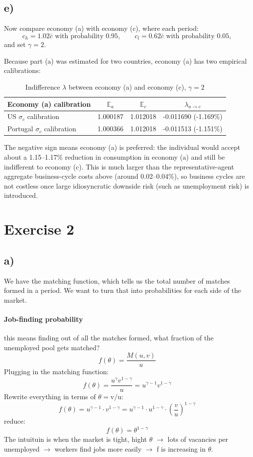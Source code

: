 \documentclass[12pt]{article}
\begin{document}
\subsection{e)}

Now compare economy (a) with economy (c), where each period:
$$
c_h=1.02\bar c \text{ with probability }0.95, \qquad
c_l=0.62\bar c \text{ with probability }0.05,
$$
and set $\gamma=2$.

Because part (a) was estimated for two countries, economy (a) has two empirical calibrations:
\begin{table}[H]
\centering
\caption{Indifference $\lambda$ between economy (a) and economy (c), $\gamma=2$}
\label{tab:ex1e}
\begin{tabular}{lccc}
\toprule
Economy (a) calibration & $\mathbb{E}_a$ & $\mathbb{E}_c$ & $\lambda_{a\to c}$ \\
\midrule
US $\sigma_c$ calibration & 1.000187 & 1.012018 & -0.011690 \;(-1.169\%) \\
Portugal $\sigma_c$ calibration & 1.000366 & 1.012018 & -0.011513 \;(-1.151\%) \\
\bottomrule
\end{tabular}
\end{table}

The negative sign means economy (a) is preferred: the individual would accept about a 1.15--1.17\% reduction in consumption in economy (a) and still be indifferent to economy (c). This is much larger than the representative-agent aggregate business-cycle costs above (around 0.02--0.04\%), so business cycles are not costless once large idiosyncratic downside risk (such as unemployment risk) is introduced.


\section{Exercise 2}
\subsection{a)}
We have the matching function, which tells us the total number of matches formed in a period. We want to turn that into probabilities for each side of the market.
\paragraph{Job-finding probability}
this means finding out of all the matches formed, what fraction of the unemployed pool gets matched?
$$
f(\theta)=\frac{M(u, v)}{u}
$$
Plugging in the matching function:
$$
f(\theta)=\frac{u^\gamma v^{1-\gamma}}{u}=u^{\gamma-1} v^{1-\gamma}
$$
Rewrite everything in terms of $\theta=\mathrm{v} / \mathrm{u}$:
$$
f(\theta)=u^{\gamma-1} \cdot v^{1-\gamma}=u^{\gamma-1} \cdot u^{1-\gamma} \cdot\left(\frac{v}{u}\right)^{1-\gamma}
$$
reduce:
$$
\boxed{f(\theta)=\theta^{1-\gamma}}
$$
The intuituin is when the market is tight, hight $\theta$ $\rightarrow$ lots of vacancies per unemployed $\rightarrow$ workers find jobs more easily $\rightarrow$ f is increasing in $\theta$.
\end{document}
